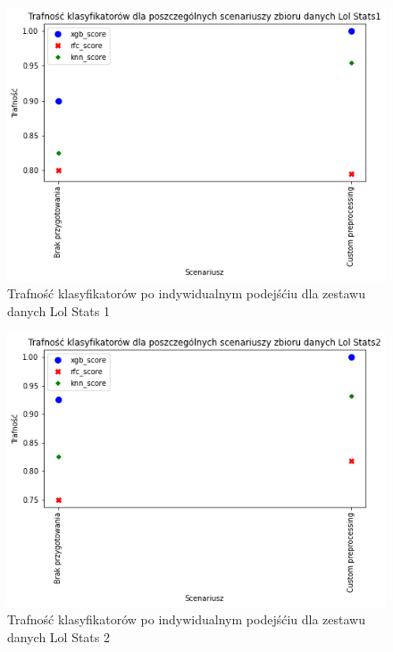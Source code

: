 \documentclass{book}
\begin{document}
\begin{figure}[H]
\centerline{\includegraphics{Lol_Stats_1_Custom}}
\centering
\caption{Trafność klasyfikatorów po indywidualnym podejśćiu dla zestawu danych Lol Stats 1}
\end{figure}

\begin{figure}[H]
\centerline{\includegraphics{Lol_Stats_2_Custom}}
\centering
\caption{Trafność klasyfikatorów po indywidualnym podejśćiu dla zestawu danych Lol Stats 2}
\end{figure}
\end{document}

